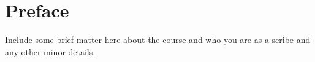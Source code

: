 \documentclass[../notes.tex]{subfile}
\begin{document}
\chapter[Preface]{Preface}\label{chap:Preface}

Include some brief matter here about the course and who you are as a scribe and any other minor details.
\end{document}
